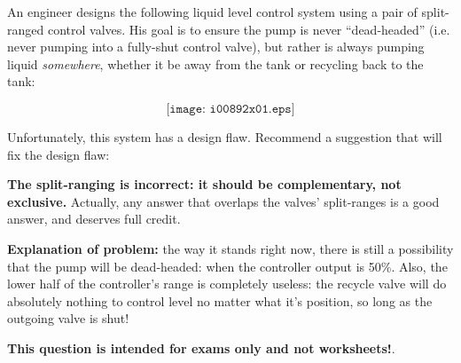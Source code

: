 

An engineer designs the following liquid level control system using a pair of split-ranged control valves.  His goal is to ensure the pump is never ``dead-headed'' (i.e. never pumping into a fully-shut control valve), but rather is always pumping liquid {\it somewhere}, whether it be away from the tank or recycling back to the tank:

$$\texttt{[image: i00892x01.eps]}$$

Unfortunately, this system has a design flaw.  Recommend a suggestion that will fix the design flaw:







{\bf The split-ranging is incorrect: it should be complementary, not exclusive.}  Actually, any answer that overlaps the valves' split-ranges is a good answer, and deserves full credit.

\vskip 10pt

\noindent
{\bf Explanation of problem:} the way it stands right now, there is still a possibility that the pump will be dead-headed: when the controller output is 50\%.  Also, the lower half of the controller's range is completely useless: the recycle valve will do absolutely nothing to control level no matter what it's position, so long as the outgoing valve is shut!







{\bf This question is intended for exams only and not worksheets!}.



